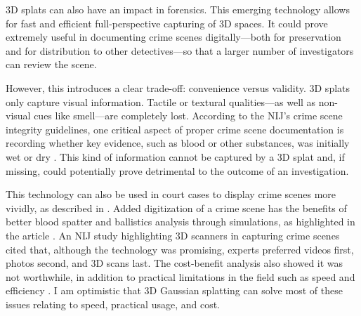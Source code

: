 \documentclass[10pt,twocolumn]{article}
\begin{document}
3D splats can also have an impact in forensics. This emerging technology allows for fast and efficient full-perspective capturing of 3D spaces. It could prove extremely useful in documenting crime scenes digitally—both for preservation and for distribution to other detectives—so that a larger number of investigators can review the scene.

However, this introduces a clear trade-off: convenience versus validity. 3D splats only capture visual information. Tactile or textural qualities—as well as non-visual cues like smell—are completely lost. According to the NIJ’s crime scene integrity guidelines, one critical aspect of proper crime scene documentation is recording whether key evidence, such as blood or other substances, was initially wet or dry \cite{narDataPrivacyPrinciples}. This kind of information cannot be captured by a 3D splat and, if missing, could potentially prove detrimental to the outcome of an investigation.

This technology can also be used in court cases to display crime scenes more vividly, as described in \cite{kowbuz2020crime}. Added digitization of a crime scene has the benefits of better blood spatter and ballistics analysis through simulations, as highlighted in the article \cite{kowbuz2020crime}. An NIJ study highlighting 3D scanners in capturing crime scenes cited that, although the technology was promising, experts preferred videos first, photos second, and 3D scans last. The cost-benefit analysis also showed it was not worthwhile, in addition to practical limitations in the field such as speed and efficiency \cite{nij2021scanning}. I am optimistic that 3D Gaussian splatting can solve most of these issues relating to speed, practical usage, and cost.


\printbibliography
\end{document}
